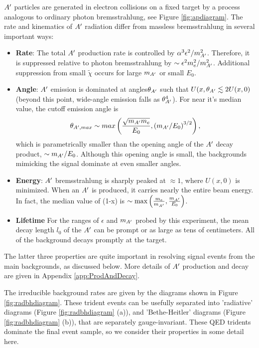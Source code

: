 $A^\prime$ particles are generated in electron collisions on a fixed target by a process analogous to ordinary photon bremsstrahlung, see Figure \ref{fig:apdiagram}.  The rate and kinematics of $A^\prime$ radiation differ from massless bremsstrahlung in several important ways:
\begin{itemize}
\item  {\bf Rate}: The total $A^\prime$ production rate is controlled by $\alpha^3\epsilon^2 / m_{A^\prime}^2$.  
 Therefore, it is suppressed relative to photon bremsstrahlung by $\sim \epsilon^2 m_e^2/m_{A^\prime}^2$.  Additional suppression from small $\tilde{\chi}$  occurs for large $m_{A^\prime}$  or small $E_0$.
\item {\bf Angle}:  $A^\prime$ emission is dominated at angles$\theta_{A^\prime}$ such that $U(x,\theta_{A^\prime}\lesssim 2 U(x,0)$ (beyond this point, wide-angle emission falls as $\theta_{A^\prime}^4$).  For near it's median value, the cutoff emission angle is
\begin{equation}
\theta_{A^\prime,max}\sim max\left(\frac{\sqrt{m_{A^\prime} m_e}}{E_0},\left(m_{A^\prime}/E_0\right)^{3/2}\right),
\end{equation}
which is parametrically smaller than the opening angle of the $A^\prime$ decay product, $\sim  m_{A^\prime}/E_0$.  Although this opening angle is small, the backgrounds mimicking the signal dominate at even smaller angles.
\item {\bf Energy}:  $A^\prime$ bremsstrahlung is sharply peaked at $\approx 1$, where $U(x,0)$ is minimized.  When an $A^\prime$ is produced, it carries nearly the entire beam energy.  In fact, the median value of (1-x) is $\sim {\rm max}\left(\frac{m_e}{m_{A^\prime}},\frac{m_{A^\prime}}{E_0}\right)$.  
\item{\bf Lifetime} For the ranges of $\epsilon$ and $m_{A^\prime}$ probed by this experiment, the mean decay length $l_0$ of the $A^\prime$ can be prompt or as large as tens of centimeters. All of the background decays promptly at the target.  
\end{itemize}
The  latter three properties are quite important in resolving signal events from the main backgrounds, as discussed
below.   More details of $A^\prime$ production and decay are given in Appendix \ref{app:ProdAndDecay}.

The irreducible background rates are given by the diagrams shown in Figure \ref{fig:radbhdiagram}. These trident events can be usefully separated into 'radiative' diagrams (Figure \ref{fig:radbhdiagram} (a)), and 'Bethe-Heitler' diagrams (Figure \ref{fig:radbhdiagram} (b)), that are separately gauge-invariant.  These QED tridents dominate the final event sample, so we consider their properties in some detail here.

